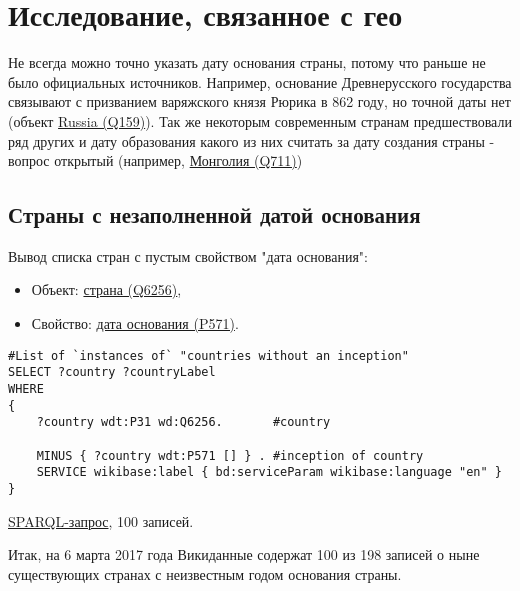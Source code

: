 \section{Исследование, связанное с гео}


Не всегда можно точно указать дату основания страны, потому что раньше не было официальных источников. Например, основание Древнерусского государства связывают с призванием варяжского князя Рюрика в 862 году, но точной даты нет (объект \href{https://www.wikidata.org/wiki/Q159} {Russia (Q159)}). Так же некоторым современным странам предшествовали ряд других и дату образования какого из них считать за дату создания страны - вопрос открытый (например, \href{https://www.wikidata.org/wiki/Q711}{Монголия (Q711)})


\subsection{Страны с незаполненной датой основания}

Вывод списка стран с пустым свойством "дата основания":

\begin{itemize}
    \item Объект: \href{https://www.wikidata.org/wiki/Q6256}{страна (Q6256)},
    \item Свойство: \href{https://www.wikidata.org/wiki/Property:P571}{дата основания (P571)}.
\end{itemize}

\begin{lstlisting}[language=SPARQL]
#List of `instances of` "countries without an inception" 
SELECT ?country ?countryLabel 
WHERE
{
    ?country wdt:P31 wd:Q6256.       #country
    
    MINUS { ?country wdt:P571 [] } . #inception of country
    SERVICE wikibase:label { bd:serviceParam wikibase:language "en" }
}
\end{lstlisting}

\href{https://query.wikidata.org/#%23List%20of%20%60instances%20of%60%20%22countries%20without%20a%20inception%22%20%0ASELECT%20%3Fcountry%20%3FcountryLabel%20%0AWHERE%0A%7B%0A%20%20%20%20%3Fcountry%20wdt%3AP31%20wd%3AQ6256.%20%23country%0A%20%20%20%20%0A%20%20%20%20MINUS%20%7B%20%3Fcountry%20wdt%3AP571%20%5B%5D%20%7D%20.%20%23inception%20of%20country%0A%20%20%20%20SERVICE%20wikibase%3Alabel%20%7B%20bd%3AserviceParam%20wikibase%3Alanguage%20%22en%22%20%7D%0A%7D%0A%0A}{SPARQL-запрос}, 100 записей.

Итак, на 6 марта 2017 года Викиданные содержат 100 из 198 записей о ныне существующих странах с неизвестным годом основания страны.